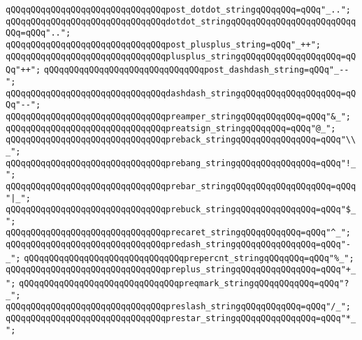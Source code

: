 \verb|qQQqqQQqqQQqqQQqqQQqqQQqqQQqqQQqpost_dotdot_stringqQQqqQQq=qQQq"_..";|\newline
\verb|qQQqqQQqqQQqqQQqqQQqqQQqqQQqqQQqdotdot_stringqQQqqQQqqQQqqQQqqQQqqQQqqQQq=qQQq"..";|\newline
\newline
\verb|qQQqqQQqqQQqqQQqqQQqqQQqqQQqqQQqpost_plusplus_string=qQQq"_++";|\newline
\verb|qQQqqQQqqQQqqQQqqQQqqQQqqQQqqQQqplusplus_stringqQQqqQQqqQQqqQQqqQQq=qQQq"++";|\newline
\newline
\verb|qQQqqQQqqQQqqQQqqQQqqQQqqQQqqQQqpost_dashdash_string=qQQq"_--";|\newline
\verb|qQQqqQQqqQQqqQQqqQQqqQQqqQQqqQQqdashdash_stringqQQqqQQqqQQqqQQqqQQq=qQQq"--";|\newline
\newline
\verb|qQQqqQQqqQQqqQQqqQQqqQQqqQQqqQQqpreamper_stringqQQqqQQqqQQq=qQQq"&_";|\newline
\verb|qQQqqQQqqQQqqQQqqQQqqQQqqQQqqQQqpreatsign_stringqQQqqQQq=qQQq"@_";|\newline
\verb|qQQqqQQqqQQqqQQqqQQqqQQqqQQqqQQqpreback_stringqQQqqQQqqQQqqQQq=qQQq"\\_";|\newline
\verb|qQQqqQQqqQQqqQQqqQQqqQQqqQQqqQQqprebang_stringqQQqqQQqqQQqqQQq=qQQq"!_";|\newline
\verb|qQQqqQQqqQQqqQQqqQQqqQQqqQQqqQQqprebar_stringqQQqqQQqqQQqqQQqqQQq=qQQq"|\verb#|_";#\newline
\verb|qQQqqQQqqQQqqQQqqQQqqQQqqQQqqQQqprebuck_stringqQQqqQQqqQQqqQQq=qQQq"$_";|\newline
\verb|qQQqqQQqqQQqqQQqqQQqqQQqqQQqqQQqprecaret_stringqQQqqQQqqQQq=qQQq"^_";|\newline
\verb|qQQqqQQqqQQqqQQqqQQqqQQqqQQqqQQqpredash_stringqQQqqQQqqQQqqQQq=qQQq"-_";|\newline
\verb|qQQqqQQqqQQqqQQqqQQqqQQqqQQqqQQqprepercnt_stringqQQqqQQq=qQQq"%_";|\newline
\verb|qQQqqQQqqQQqqQQqqQQqqQQqqQQqqQQqpreplus_stringqQQqqQQqqQQqqQQq=qQQq"+_";|\newline
\verb|qQQqqQQqqQQqqQQqqQQqqQQqqQQqqQQqpreqmark_stringqQQqqQQqqQQq=qQQq"?_";|\newline
\verb|qQQqqQQqqQQqqQQqqQQqqQQqqQQqqQQqpreslash_stringqQQqqQQqqQQq=qQQq"/_";|\newline
\verb|qQQqqQQqqQQqqQQqqQQqqQQqqQQqqQQqprestar_stringqQQqqQQqqQQqqQQq=qQQq"*_";|\newline
